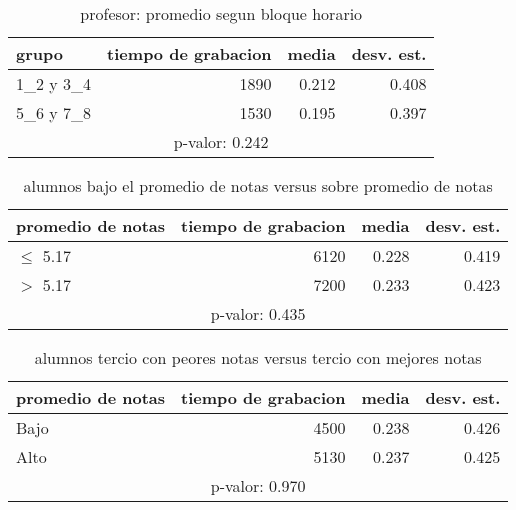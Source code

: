 \documentclass[spanish]{article}
\begin{document}
\begin{table}[h!]
\begin{center}
\begin{tabular}{|l|r|r|r|}
\hline
grupo     & tiempo de grabacion & media          & desv. est.    \\ \hline
1\_2 y 3\_4 &                1890 &          0.212 &          0.408\\ \hline
5\_6 y 7\_8 &                1530 &          0.195 &          0.397\\ \hline
\multicolumn{4}{|c|}{p-valor: 0.242} \\ \hline
\end{tabular}
\caption{profesor: promedio segun bloque horario}
\end{center}
\end{table}

\begin{table}[h!]
\begin{center}
\begin{tabular}{|l|r|r|r|}
\hline
promedio de notas & tiempo de grabacion & media          & desv. est.    \\ \hline
$\leq$ 5.17           &                6120 &          0.228 &          0.419\\ \hline
$>$ 5.17            &                7200 &          0.233 &          0.423\\ \hline
\multicolumn{4}{|c|}{p-valor: 0.435} \\ \hline
\end{tabular}
\caption{alumnos bajo el promedio de notas versus sobre promedio de notas}
\end{center}
\end{table}

\begin{table}[h!]
\begin{center}
\begin{tabular}{|l|r|r|r|}
\hline
promedio de notas & tiempo de grabacion & media          & desv. est.    \\ \hline
Bajo              &                4500 &          0.238 &          0.426\\ \hline
Alto              &                5130 &          0.237 &          0.425\\ \hline
\multicolumn{4}{|c|}{p-valor: 0.970} \\ \hline
\end{tabular}
\caption{alumnos tercio con peores notas versus tercio con mejores notas}
\end{center}
\end{table}
\end{document}
